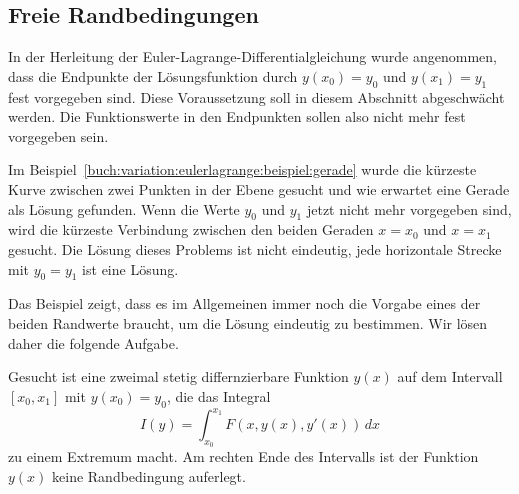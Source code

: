%
%
\subsection{Freie Randbedingungen
\label{buch:variation:eulerlagrange:subsection:freierb}}
In der Herleitung der Euler-Lagrange-Differentialgleichung wurde angenommen,
dass die Endpunkte der Lösungsfunktion durch $y(x_0)=y_0$ und $y(x_1)=y_1$
fest vorgegeben sind.
Diese Voraussetzung soll in diesem Abschnitt abgeschwächt werden.
Die Funktionswerte in den Endpunkten sollen also nicht mehr fest
vorgegeben sein.

\begin{beispiel}
\label{buch:variation:eulerlagrange:beispiel:freiegerade}
Im Beispiel~\ref{buch:variation:eulerlagrange:beispiel:gerade}
wurde die kürzeste Kurve zwischen zwei Punkten in der Ebene
gesucht und wie erwartet eine Gerade als Lösung gefunden.
Wenn die Werte $y_0$ und $y_1$ jetzt nicht mehr vorgegeben sind,
wird die kürzeste Verbindung zwischen den beiden Geraden
$x=x_0$ und $x=x_1$ gesucht.
Die Lösung dieses Problems ist nicht eindeutig, jede horizontale
Strecke mit $y_0=y_1$ ist eine Lösung.
\end{beispiel}

Das Beispiel zeigt, dass es im Allgemeinen immer noch die Vorgabe
eines der beiden Randwerte braucht, um die Lösung eindeutig zu
bestimmen.
Wir lösen daher die folgende Aufgabe.

\begin{aufgabe}
Gesucht ist eine zweimal stetig differnzierbare Funktion $y(x)$ auf
dem Intervall $[x_0,x_1]$ mit $y(x_0)=y_0$, die das Integral
\[
I(y)
=
\int_{x_0}^{x_1} F(x,y(x),y'(x))\,dx
\]
zu einem Extremum macht.
Am rechten Ende des Intervalls ist der Funktion $y(x)$ keine
Randbedingung auferlegt.
\end{aufgabe}

